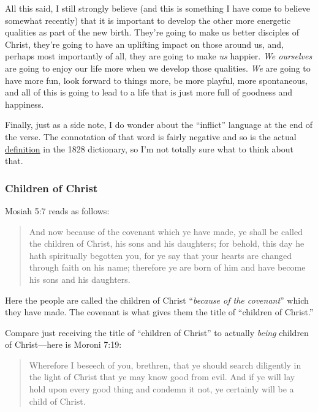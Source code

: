 			All this said, I still strongly believe (and this is something I have come to believe somewhat recently) that it is important to develop the other more energetic qualities as part of the new birth. They're going to make us better disciples of Christ, they're going to have an uplifting impact on those around us, and, perhaps most importantly of all, they are going to make \textit{us} happier. \textit{We ourselves} are going to enjoy our life more when we develop those qualities. \textit{We} are going to have more fun, look forward to things more, be more playful, more spontaneous, and all of this is going to lead to a life that is just more full of goodness and happiness.
			
			Finally, just as a side note, I do wonder about the ``inflict'' language at the end of the verse. The connotation of that word is fairly negative and so is the actual \hyperref[INFLICT-1828]{definition} in the 1828 dictionary, so I'm not totally sure what to think about that.
			
	\subsubsection{Children of Christ}
		\label{NEWBIRTH-children-christ}
		
		Mosiah 5:7 reads as follows:
		
			\begin{quote}
				And now because of the covenant which ye have made, ye shall be called the children of Christ, his sons and his daughters; for behold, this day he hath spiritually begotten you, for ye say that your hearts are changed through faith on his name; therefore ye are born of him and have become his sons and his daughters.
			\end{quote}
			
		Here the people are called the children of Christ ``\textit{because of the covenant}'' which they have made. The covenant is what gives them the title of ``children of Christ.''
		
		Compare just receiving the title of ``children of Christ'' to actually \textit{being} children of Christ---here is Moroni 7:19:
		
			\begin{quote}
				Wherefore I beseech of you, brethren, that ye should search diligently in the light of Christ that ye may know good from evil. And if ye will lay hold upon every good thing and condemn it not, ye certainly will be a child of Christ. 
			\end{quote}
			
